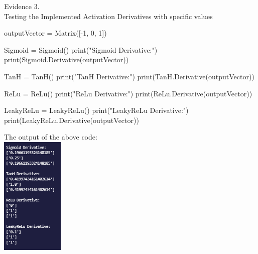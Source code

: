 \begin{center}
    {\large Evidence 3.\rn } \\ 
    \vspace{0.3cm}
    Testing the Implemented Activation Derivatives with specific values \\
    
    \begin{pythoncode}
outputVector = Matrix([-1, 0, 1])

Sigmoid = Sigmoid()
print("Sigmoid Derivative:")
print(Sigmoid.Derivative(outputVector))

TanH = TanH()
print("TanH Derivative:")
print(TanH.Derivative(outputVector))

ReLu = ReLu()
print("ReLu Derivative:")
print(ReLu.Derivative(outputVector)) 

LeakyReLu = LeakyReLu()
print("LeakyReLu Derivative:")
print(LeakyReLu.Derivative(outputVector))
    \end{pythoncode}

    The output of the above code: \\
    \includegraphics[width=3cm]{Images/Testing/T3AllDer.PNG} \\


\end{center}
